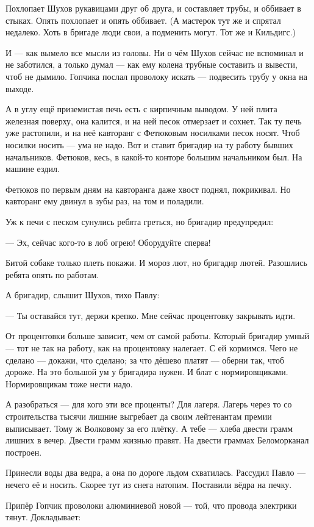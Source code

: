 Похлопает Шухов рукавицами друг об друга, и составляет трубы, и оббивает в стыках. Опять
похлопает и опять оббивает. (А мастерок тут же и спрятал недалеко. Хоть в бригаде люди свои, а
подменить могут. Тот же и Кильдигс.)

И --- как вымело все мысли из головы. Ни о чём Шухов сейчас не вспоминал и не заботился, а
только думал --- как ему колена трубные составить и вывести, чтоб не дымило. Гопчика послал
проволоку искать --- подвесить трубу у окна на выходе.

А в углу ещё приземистая печь есть с кирпичным выводом. У ней плита железная поверху, она
калится, и на ней песок отмерзает и сохнет. Так ту печь уже растопили, и на неё кавторанг с
Фетюковым носилками песок носят. Чтоб носилки носить --- ума не надо. Вот и ставит бригадир на
ту работу бывших начальников. Фетюков, кесь, в какой-то конторе большим начальником был. На
машине ездил.

Фетюков по первым дням на кавторанга даже хвост поднял, покрикивал. Но кавторанг ему двинул
в зубы раз, на том и поладили.

Уж к печи с песком сунулись ребята греться, но бригадир предупредил:

--- Эх, сейчас кого-то в лоб огрею! Оборудуйте сперва!

Битой собаке только плеть покажи. И мороз лют, но бригадир лютей. Разошлись ребята опять по
работам.

А бригадир, слышит Шухов, тихо Павлу:

--- Ты оставайся тут, держи крепко. Мне сейчас процентовку закрывать идти.

От процентовки больше зависит, чем от самой работы. Который бригадир умный --- тот не так на
работу, как на процентовку налегает. С ей кормимся. Чего не сделано --- докажи, что сделано; за
что дёшево платят --- оберни так, чтоб дороже. На это большой ум у бригадира нужен. И блат с
нормировщиками. Нормировщикам тоже нести надо.

А разобраться --- для кого эти все проценты? Для лагеря. Лагерь через то со строительства
тысячи лишние выгребает да своим лейтенантам премии выписывает. Тому ж Волковому за его
плётку. А тебе --- хлеба двести грамм лишних в вечер. Двести грамм жизнью правят. На двести
граммах Беломорканал построен.

Принесли воды два ведра, а она по дороге льдом схватилась. Рассудил Павло --- нечего её и
носить. Скорее тут из снега натопим. Поставили вёдра на печку.

Припёр Гопчик проволоки алюминиевой новой --- той, что провода электрики тянут. Докладывает:

